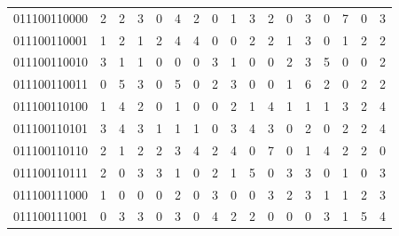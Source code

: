 \documentclass[10pt,a4paper]{article}
\begin{document}
\begin{longtable}{ |c|c|c|c|c|c|c|c|c|c|c|c|c|c|c|c|c| }
    011100110000              & 2                            & 2                                & 3                            & 0                              & 4   & 2   & 0   & 1   & 3   & 2   & 0   & 3   & 0   & 7   & 0   & 3   \\
    011100110001              & 1                            & 2                                & 1                            & 2                              & 4   & 4   & 0   & 0   & 2   & 2   & 1   & 3   & 0   & 1   & 2   & 2   \\
    011100110010              & 3                            & 1                                & 1                            & 0                              & 0   & 0   & 3   & 1   & 0   & 0   & 2   & 3   & 5   & 0   & 0   & 2   \\
    011100110011              & 0                            & 5                                & 3                            & 0                              & 5   & 0   & 2   & 3   & 0   & 0   & 1   & 6   & 2   & 0   & 2   & 2   \\
    011100110100              & 1                            & 4                                & 2                            & 0                              & 1   & 0   & 0   & 2   & 1   & 4   & 1   & 1   & 1   & 3   & 2   & 4   \\
    011100110101              & 3                            & 4                                & 3                            & 1                              & 1   & 1   & 0   & 3   & 4   & 3   & 0   & 2   & 0   & 2   & 2   & 4   \\
    011100110110              & 2                            & 1                                & 2                            & 2                              & 3   & 4   & 2   & 4   & 0   & 7   & 0   & 1   & 4   & 2   & 2   & 0   \\
    011100110111              & 2                            & 0                                & 3                            & 3                              & 1   & 0   & 2   & 1   & 5   & 0   & 3   & 3   & 0   & 1   & 0   & 3   \\
    011100111000              & 1                            & 0                                & 0                            & 0                              & 2   & 0   & 3   & 0   & 0   & 3   & 2   & 3   & 1   & 1   & 2   & 3   \\
    011100111001              & 0                            & 3                                & 3                            & 0                              & 3   & 0   & 4   & 2   & 2   & 0   & 0   & 0   & 3   & 1   & 5   & 4   \\

\end{longtable}
\end{document}
